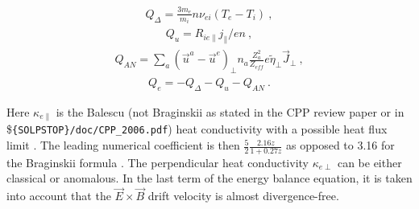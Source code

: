 \documentclass[a4paper,10pt]{report}
\begin{document}
\begin{gather}
        Q_{\Delta} = \frac{3 m_e}{m_i} n \nu _{ei} \left(
T_e - T_i
\right)~,
\end{gather}
\begin{gather}
        Q_u = R _{ie \parallel} j_{\parallel}/en~,
\end{gather}
\begin{gather}
        Q_{AN} = \sum_{a} \left(\vec{u}^a -\vec{u}^e\right)_\perp n_a
                 \frac{Z_a^2}{Z_{eff}}e \tilde{\eta}_\perp \vec{J}_\perp~,
\end{gather}
\begin{gather}
        Q_e = -Q_{\Delta} - Q_u - Q_{AN}~.
\end{gather}


Here $\kappa _{e \parallel}$ is the Balescu (not Braginskii as stated in the CPP review paper \cite{SOLPS_review}
or in \${\tt \{SOLPSTOP\}/doc/CPP\_2006.pdf}) heat
conductivity with a possible heat
flux limit \cite{BRAAMS96B}.
The leading numerical coefficient is then $\frac{5}{2} \frac{2.16 z}{1 + 0.27 z}$ as opposed to 3.16 for the Braginskii
formula \cite{NRL}. The perpendicular heat conductivity
$\kappa _{e \perp}$ can be
either classical or anomalous. In the last term of the energy balance
equation, it is taken into account that the $\vec{E} \times \vec{B}$
drift velocity is
almost divergence-free.
\end{document}
